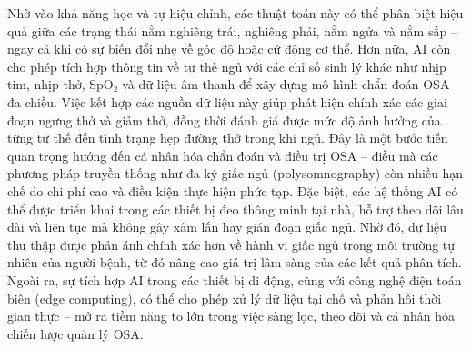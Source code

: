 Nhờ vào khả năng học và tự hiệu chỉnh, các thuật toán này có thể phân biệt hiệu quả giữa các trạng thái nằm nghiêng trái, nghiêng phải, nằm ngửa và nằm sấp – ngay cả khi có sự biến đổi nhẹ về góc độ hoặc cử động cơ thể. Hơn nữa, AI còn cho phép tích hợp thông tin về tư thế ngủ với các chỉ số sinh lý khác như nhịp tim, nhịp thở, SpO₂ và dữ liệu âm thanh để xây dựng mô hình chẩn đoán OSA đa chiều. Việc kết hợp các nguồn dữ liệu này giúp phát hiện chính xác các giai đoạn ngưng thở và giảm thở, đồng thời đánh giá được mức độ ảnh hưởng của từng tư thế đến tình trạng hẹp đường thở trong khi ngủ. Đây là một bước tiến quan trọng hướng đến cá nhân hóa chẩn đoán và điều trị OSA – điều mà các phương pháp truyền thống như đa ký giấc ngủ (polysomnography) còn nhiều hạn chế do chi phí cao và điều kiện thực hiện phức tạp. Đặc biệt, các hệ thống AI có thể được triển khai trong các thiết bị đeo thông minh tại nhà, hỗ trợ theo dõi lâu dài và liên tục mà không gây xâm lấn hay gián đoạn giấc ngủ. Nhờ đó, dữ liệu thu thập được phản ánh chính xác hơn về hành vi giấc ngủ trong môi trường tự nhiên của người bệnh, từ đó nâng cao giá trị lâm sàng của các kết quả phân tích. Ngoài ra, sự tích hợp AI trong các thiết bị di động, cùng với công nghệ điện toán biên (edge computing), có thể cho phép xử lý dữ liệu tại chỗ và phản hồi thời gian thực – mở ra tiềm năng to lớn trong việc sàng lọc, theo dõi và cá nhân hóa chiến lược quản lý OSA.

















% 

